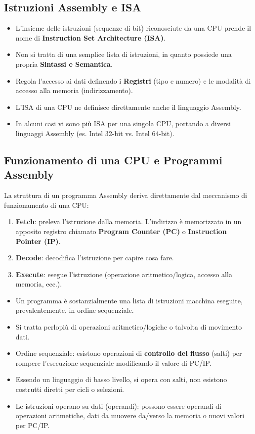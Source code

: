 \documentclass[12pt, a4paper]{article}
\begin{document}
\subsection{Istruzioni Assembly e ISA}
\begin{itemize}
    \item L'insieme delle istruzioni (sequenze di bit) riconosciute da una CPU prende il nome di \textbf{Instruction Set Architecture (ISA)}.
    \item Non si tratta di una semplice lista di istruzioni, in quanto possiede una propria \textbf{Sintassi e Semantica}.
    \item Regola l'accesso ai dati definendo i \textbf{Registri} (tipo e numero) e le modalità di accesso alla memoria (indirizzamento).
    \item L'ISA di una CPU ne definisce direttamente anche il linguaggio Assembly.
    \item In alcuni casi vi sono più ISA per una singola CPU, portando a diversi linguaggi Assembly (es. Intel 32-bit vs. Intel 64-bit).
\end{itemize}

\subsection{Funzionamento di una CPU e Programmi Assembly}
La struttura di un programma Assembly deriva direttamente dal meccanismo di funzionamento di una CPU:
\begin{enumerate}
    \item \textbf{Fetch}: preleva l'istruzione dalla memoria. L'indirizzo è memorizzato in un apposito registro chiamato \textbf{Program Counter (PC)} o \textbf{Instruction Pointer (IP)}.
    \item \textbf{Decode}: decodifica l'istruzione per capire cosa fare.
    \item \textbf{Execute}: esegue l'istruzione (operazione aritmetico/logica, accesso alla memoria, ecc.).
\end{enumerate}
\begin{itemize}
    \item Un programma è sostanzialmente una lista di istruzioni macchina eseguite, prevalentemente, in ordine sequenziale.
    \item Si tratta perlopiù di operazioni aritmetico/logiche o talvolta di movimento dati.
    \item Ordine sequenziale: esistono operazioni di \textbf{controllo del flusso} (salti) per rompere l'esecuzione sequenziale modificando il valore di PC/IP.
    \item Essendo un linguaggio di basso livello, si opera con salti, non esistono costrutti diretti per cicli o selezioni.
    \item Le istruzioni operano su dati (operandi): possono essere operandi di operazioni aritmetiche, dati da muovere da/verso la memoria o nuovi valori per PC/IP.
\end{itemize}
\end{document}
